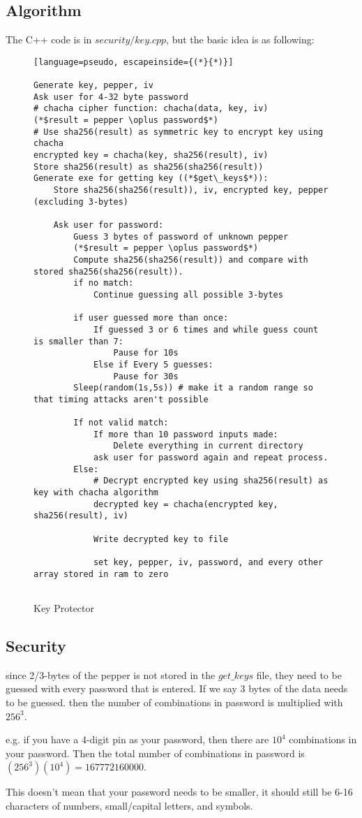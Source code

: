 \documentclass[a4paper,12pt]{article}
\begin{document}
\bigskip
\bigskip
\bigskip
\bigskip
\bigskip
\bigskip
\bigskip
\bigskip

\subsection{Algorithm}
The C++ code is in $security/key.cpp$, but the basic idea is as following:

\begin{figure}[htb]
\begin{small}
\begin{lstlisting}[language=pseudo, escapeinside={(*}{*)}]

Generate key, pepper, iv
Ask user for 4-32 byte password
# chacha cipher function: chacha(data, key, iv)
(*$result = pepper \oplus password$*)
# Use sha256(result) as symmetric key to encrypt key using chacha
encrypted key = chacha(key, sha256(result), iv)
Store sha256(result) as sha256(sha256(result))
Generate exe for getting key ((*$get\_keys$*)):
	Store sha256(sha256(result)), iv, encrypted key, pepper (excluding 3-bytes)

	Ask user for password:
		Guess 3 bytes of password of unknown pepper
		(*$result = pepper \oplus password$*)
		Compute sha256(sha256(result)) and compare with stored sha256(sha256(result)).
		if no match:
			Continue guessing all possible 3-bytes

		if user guessed more than once:
			If guessed 3 or 6 times and while guess count is smaller than 7:
				Pause for 10s
			Else if Every 5 guesses:
				Pause for 30s
		Sleep(random(1s,5s)) # make it a random range so that timing attacks aren't possible

		If not valid match:
			If more than 10 password inputs made:
				Delete everything in current directory
			ask user for password again and repeat process.
		Else:
			# Decrypt encrypted key using sha256(result) as key with chacha algorithm
			decrypted key = chacha(encrypted key, sha256(result), iv)

			Write decrypted key to file

			set key, pepper, iv, password, and every other array stored in ram to zero
			

\end{lstlisting}
\end{small}
\caption{Key Protector}\label{key_protector}
\end{figure}


\subsection{Security}
 
since 2/3-bytes of the pepper is not stored in the $get\_keys$ file, they need to be guessed with every password that is entered. If we say 3 bytes of the data needs to be guessed. then the number of combinations in password is multiplied with $256^3$.

e.g. if you have a 4-digit pin as your password, then there are $10^4$ combinations in your password. Then the total number of combinations in password is $(256^3)(10^4) = 167772160000$.

This doesn't mean that your password needs to be smaller, it should still be 6-16 characters of numbers, small/capital letters, and symbols.
\end{document}
